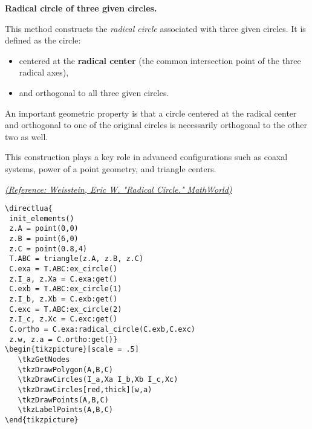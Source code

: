 \textbf{Radical circle of three given circles.}

\medskip
\noindent
This method constructs the \emph{radical circle} associated with three given circles. It is defined as the circle:

\begin{itemize}
  \item centered at the \textbf{radical center} (the common intersection point of the three radical axes),
  \item and orthogonal to all three given circles.
\end{itemize}

\noindent
An important geometric property is that a circle centered at the radical center and orthogonal to one of the original circles is necessarily orthogonal to the other two as well.

\medskip
\noindent
This construction plays a key role in advanced configurations such as coaxal systems, power of a point geometry, and triangle centers.

\begin{flushright}
\href{https://mathworld.wolfram.com/RadicalCircle.html}{\textit{(Reference: Weisstein, Eric W. "Radical Circle." MathWorld)}}
\end{flushright}

\vspace{1em}



\begin{minipage}[t]{.5\textwidth}\vspace{0pt}%
\begin{verbatim} 
\directlua{
 init_elements()
 z.A = point(0,0)
 z.B = point(6,0)
 z.C = point(0.8,4)
 T.ABC = triangle(z.A, z.B, z.C) 
 C.exa = T.ABC:ex_circle()
 z.I_a, z.Xa = C.exa:get()
 C.exb = T.ABC:ex_circle(1)
 z.I_b, z.Xb = C.exb:get()
 C.exc = T.ABC:ex_circle(2)
 z.I_c, z.Xc = C.exc:get()
 C.ortho = C.exa:radical_circle(C.exb,C.exc)
 z.w, z.a = C.ortho:get()}
\begin{tikzpicture}[scale = .5]
   \tkzGetNodes
   \tkzDrawPolygon(A,B,C)
   \tkzDrawCircles(I_a,Xa I_b,Xb I_c,Xc)
   \tkzDrawCircles[red,thick](w,a)
   \tkzDrawPoints(A,B,C)
   \tkzLabelPoints(A,B,C)
\end{tikzpicture}
\end{verbatim}
\end{minipage}


